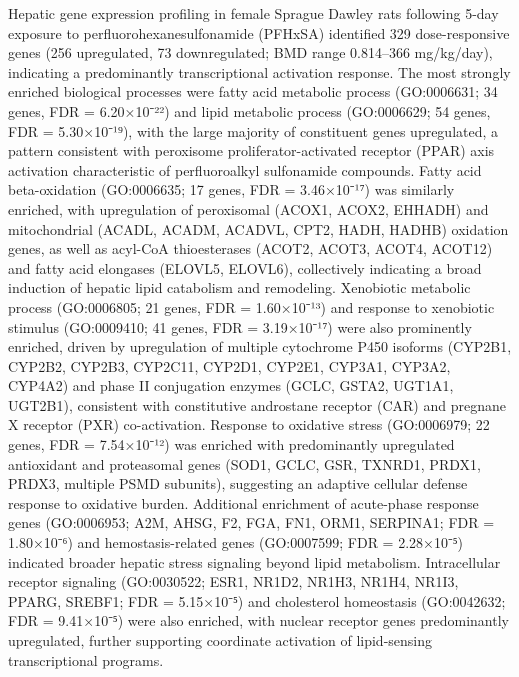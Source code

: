 Hepatic gene expression profiling in female Sprague Dawley rats following 5-day exposure to perfluorohexanesulfonamide (PFHxSA) identified 329 dose-responsive genes (256 upregulated, 73 downregulated; BMD range 0.814–366 mg/kg/day), indicating a predominantly transcriptional activation response. The most strongly enriched biological processes were fatty acid metabolic process (GO:0006631; 34 genes, FDR = 6.20×10⁻²²) and lipid metabolic process (GO:0006629; 54 genes, FDR = 5.30×10⁻¹⁹), with the large majority of constituent genes upregulated, a pattern consistent with peroxisome proliferator-activated receptor (PPAR) axis activation characteristic of perfluoroalkyl sulfonamide compounds. Fatty acid beta-oxidation (GO:0006635; 17 genes, FDR = 3.46×10⁻¹⁷) was similarly enriched, with upregulation of peroxisomal (ACOX1, ACOX2, EHHADH) and mitochondrial (ACADL, ACADM, ACADVL, CPT2, HADH, HADHB) oxidation genes, as well as acyl-CoA thioesterases (ACOT2, ACOT3, ACOT4, ACOT12) and fatty acid elongases (ELOVL5, ELOVL6), collectively indicating a broad induction of hepatic lipid catabolism and remodeling. Xenobiotic metabolic process (GO:0006805; 21 genes, FDR = 1.60×10⁻¹³) and response to xenobiotic stimulus (GO:0009410; 41 genes, FDR = 3.19×10⁻¹⁷) were also prominently enriched, driven by upregulation of multiple cytochrome P450 isoforms (CYP2B1, CYP2B2, CYP2B3, CYP2C11, CYP2D1, CYP2E1, CYP3A1, CYP3A2, CYP4A2) and phase II conjugation enzymes (GCLC, GSTA2, UGT1A1, UGT2B1), consistent with constitutive androstane receptor (CAR) and pregnane X receptor (PXR) co-activation. Response to oxidative stress (GO:0006979; 22 genes, FDR = 7.54×10⁻¹²) was enriched with predominantly upregulated antioxidant and proteasomal genes (SOD1, GCLC, GSR, TXNRD1, PRDX1, PRDX3, multiple PSMD subunits), suggesting an adaptive cellular defense response to oxidative burden. Additional enrichment of acute-phase response genes (GO:0006953; A2M, AHSG, F2, FGA, FN1, ORM1, SERPINA1; FDR = 1.80×10⁻⁶) and hemostasis-related genes (GO:0007599; FDR = 2.28×10⁻⁵) indicated broader hepatic stress signaling beyond lipid metabolism. Intracellular receptor signaling (GO:0030522; ESR1, NR1D2, NR1H3, NR1H4, NR1I3, PPARG, SREBF1; FDR = 5.15×10⁻⁵) and cholesterol homeostasis (GO:0042632; FDR = 9.41×10⁻⁵) were also enriched, with nuclear receptor genes predominantly upregulated, further supporting coordinate activation of lipid-sensing transcriptional programs.

